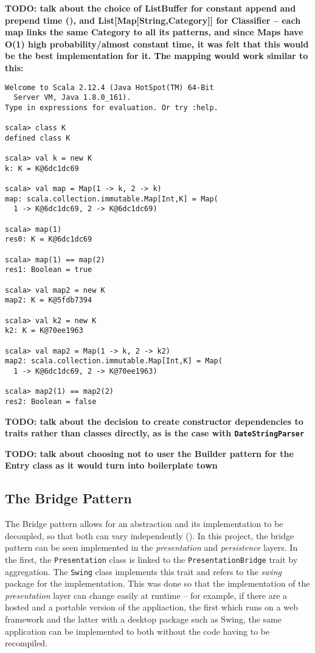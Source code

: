 \textbf{TODO: talk about the choice of ListBuffer for constant append and
prepend time (\cite[][location~15415]{odersky2016scala}), and
List[Map[String,Category]] for Classifier -- each map links the same Category
to all its patterns, and since Maps have O(1) high probability/almost constant
time, it was felt that this would be the best implementation for it. The
mapping would work similar to this:} 

\begin{lstlisting}
Welcome to Scala 2.12.4 (Java HotSpot(TM) 64-Bit 
  Server VM, Java 1.8.0_161).
Type in expressions for evaluation. Or try :help.

scala> class K
defined class K

scala> val k = new K
k: K = K@6dc1dc69

scala> val map = Map(1 -> k, 2 -> k)
map: scala.collection.immutable.Map[Int,K] = Map(
  1 -> K@6dc1dc69, 2 -> K@6dc1dc69)

scala> map(1)
res0: K = K@6dc1dc69

scala> map(1) == map(2)
res1: Boolean = true

scala> val map2 = new K
map2: K = K@5fdb7394

scala> val k2 = new K
k2: K = K@70ee1963

scala> val map2 = Map(1 -> k, 2 -> k2)
map2: scala.collection.immutable.Map[Int,K] = Map(
  1 -> K@6dc1dc69, 2 -> K@70ee1963)

scala> map2(1) == map2(2)
res2: Boolean = false

\end{lstlisting}

\textbf{TODO: talk about the decision to create constructor dependencies to
traits rather than classes directly, as is the case with
\texttt{DateStringParser}}

\textbf{TODO: talk about choosing not to user the Builder pattern for the Entry
class as it would turn into boilerplate town}


\subsection{The Bridge Pattern}
The Bridge pattern allows for an abstraction and its implementation to be
decoupled, so that both can vary independently
(\cite[][Ch.~7,Location~2699]{nikolov2016scala}). In this project, the bridge
pattern can be seen implemented in the \emph{presentation} and
\emph{persistence} layers. In the first, the \texttt{Presentation} class is
linked to the \texttt{PresentationBridge} trait by aggregation. The
\texttt{Swing} class implements this trait and refers to the \emph{swing}
package for the implementation. This was done so that the implementation of the
\emph{presentation} layer can change easily at runtime -- for example, if there
are a hosted and a portable version of the appliaction, the first which runs on
a web framework and the latter with a desktop package such as Swing, the same
application can be implemented to both without the code having to be
recompiled.

